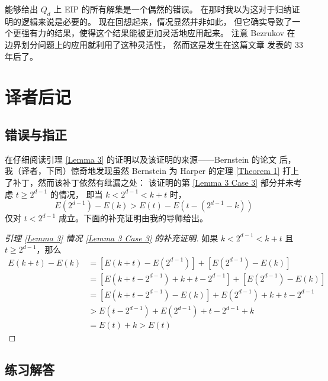 \documentclass[12pt, a4paper]{article}
\begin{document}
能够给出 $Q_d$ 上 EIP 的所有解集是一个偶然的错误。
在那时我以为这对于归纳证明的逻辑来说是必要的。
现在回想起来，情况显然并非如此，
但它确实导致了一个更强有力的结果，使得这个结果能被更加灵活地应用起来。
注意 Bezrukov 在边界划分问题上的应用就利用了这种灵活性，
然而这是发生在这篇文章 \cite{Harper.1964} 发表的 33 年后了。

\section{译者后记}
\label{Section 5}

\subsection{错误与指正}
\label{Subsection 5.1}

在仔细阅读引理 \ref{Lemma 3} 的证明以及该证明的来源——Bernstein 的论文
\cite{Bernstein.1967} 后，我（译者，下同）惊奇地发现虽然 Bernstein 为 Harper
的定理 \ref{Theorem 1} 打上了补丁，然而该补丁依然有纰漏之处：
该证明的第 \ref{Lemma 3 Case 3} 部分并未考虑 $t \ge 2^{d - 1}$ 的情况，
即当 $k < 2^{d − 1} < k + t$ 时，
\begin{equation*}
E(2^{d − 1}) − E(k) > E(t) − E(t − (2^{d − 1} − k))
\end{equation*}
仅对 $t < 2^{d - 1}$ 成立。下面的补充证明由我的导师给出。
\begin{proof}[引理 \ref{Lemma 3} 情况 \ref{Lemma 3 Case 3} 的补充证明]
如果 $k < 2^{d − 1} < k + t$ 且 $t \ge 2^{d - 1}$，那么
\begin{align*}
E(k + t) - E(k) & = \left[E(k + t) - E(2^{d - 1})\right] +
		    \left[E(2^{d - 1}) - E(k)\right] \\
		& = \left[E(k + t - 2^{d - 1}) + k + t - 2^{d - 1}\right] +
		    \left[E(2^{d - 1}) - E(k)\right] \\
		& = \left[E(k + t - 2^{d - 1}) - E(k)\right] +
		    E(2^{d - 1}) + k + t - 2^{d - 1} \\
		& > E(t - 2^{d - 1}) + E(2^{d - 1}) + t - 2^{d - 1} + k \\
		& = E(t) + k > E(t)
\end{align*}
\end{proof}

\subsection{练习解答}
\label{Subsection 5.2}
\end{document}
